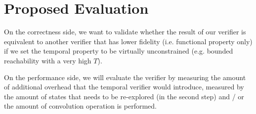 \documentclass[10pt,sigconf,letterpaper,anonymous,nonacm]{acmart}
\begin{document}

\section{Proposed Evaluation}
On the correctness side, we want to validate whether the result of our verifier is equivalent to 
another verifier that has lower fidelity (i.e. functional property only) if we set the temporal 
property to be virtually unconstrained (e.g. bounded reachability with a very high $T$).

On the performance side, we will evaluate the verifier by measuring the amount of additional 
overhead that the temporal verifier would introduce, measured by the amount of states that 
needs to be re-explored (in the second step) and / or the amount of convolution operation is 
performed.



\end{document}
